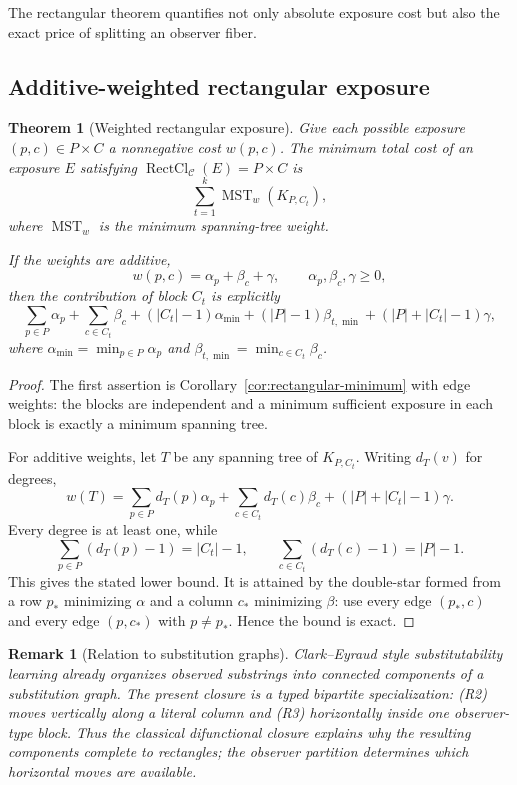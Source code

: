\documentclass[11pt]{article}
\newtheorem{theorem}[definition]{Theorem}
\newtheorem{remark}[definition]{Remark}
\newcommand{\RectCl}{\operatorname{RectCl}}
\begin{document}
The rectangular theorem quantifies not only absolute exposure cost but also the
exact price of splitting an observer fiber.

\subsection{Additive-weighted rectangular exposure}

\begin{theorem}[Weighted rectangular exposure]
\label{thm:weighted-rectangular}
Give each possible exposure $(p,c)\in P\times C$ a nonnegative cost
$w(p,c)$.  The minimum total cost of an exposure $E$ satisfying
$\RectCl_{\mathcal C}(E)=P\times C$ is
\[
 \boxed{
 \sum_{t=1}^k
 \operatorname{MST}_w(K_{P,C_t}),
 }
\]
where $\operatorname{MST}_w$ is the minimum spanning-tree weight.

If the weights are additive,
\[
 w(p,c)=\alpha_p+\beta_c+\gamma,
 \qquad \alpha_p,\beta_c,\gamma\ge0,
\]
then the contribution of block $C_t$ is explicitly
\[
 \boxed{
 \sum_{p\in P}\alpha_p
 +\sum_{c\in C_t}\beta_c
 +( |C_t|-1)\alpha_{\min}
 +( |P|-1)\beta_{t,\min}
 +( |P|+|C_t|-1)\gamma,
 }
\]
where $\alpha_{\min}=\min_{p\in P}\alpha_p$ and
$\beta_{t,\min}=\min_{c\in C_t}\beta_c$.
\end{theorem}

\begin{proof}
The first assertion is Corollary~\ref{cor:rectangular-minimum} with edge
weights: the blocks are independent and a minimum sufficient exposure in each
block is exactly a minimum spanning tree.

For additive weights, let $T$ be any spanning tree of $K_{P,C_t}$.  Writing
$d_T(v)$ for degrees,
\[
 w(T)=
 \sum_{p\in P}d_T(p)\alpha_p
 +\sum_{c\in C_t}d_T(c)\beta_c
 +( |P|+|C_t|-1)\gamma.
\]
Every degree is at least one, while
\[
 \sum_{p\in P}(d_T(p)-1)=|C_t|-1,
 \qquad
 \sum_{c\in C_t}(d_T(c)-1)=|P|-1.
\]
This gives the stated lower bound.  It is attained by the double-star formed
from a row $p_*$ minimizing $\alpha$ and a column $c_*$ minimizing $\beta$:
use every edge $(p_*,c)$ and every edge $(p,c_*)$ with $p\ne p_*$.  Hence the
bound is exact.
\end{proof}

\begin{remark}[Relation to substitution graphs]
Clark--Eyraud style substitutability learning already organizes observed
substrings into connected components of a substitution graph.  The present
closure is a typed bipartite specialization: (R2) moves vertically along a
literal column and (R3) horizontally inside one observer-type block.  Thus the
classical difunctional closure explains why the resulting components complete
to rectangles; the observer partition determines which horizontal moves are
available.
\end{remark}
\end{document}
